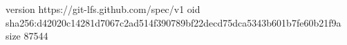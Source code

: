 version https://git-lfs.github.com/spec/v1
oid sha256:d42020c14281d7067c2ad514f390789bf22decd75dca5343b601b7fe60b21f9a
size 87544
